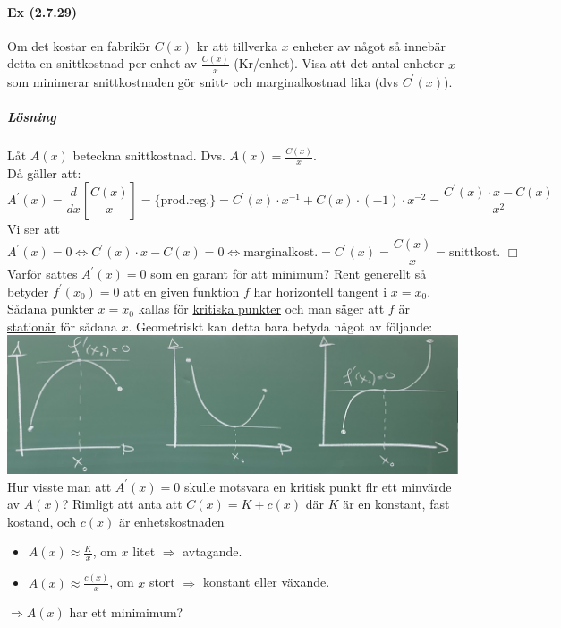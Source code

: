\paragraph{Ex (2.7.29)} Om det kostar en fabrikör $C(x)$ kr att tillverka $x$ enheter av något så innebär detta en snittkostnad per enhet av $\frac{C(x)}{x}$ (Kr/enhet).
Visa att det antal enheter $x$ som minimerar snittkostnaden gör snitt- och marginalkostnad lika (dvs $C^\prime(x)$).
\subparagraph{Lösning} Låt $A(x)$ beteckna snittkostnad. Dvs. $A(x)=\frac{C(x)}{x}$.\\
Då gäller att:
\begin{equation*}
    A^\prime(x)=\frac{d}{dx}[\frac{C(x)}{x}]=\{\text{prod.reg.}\}=C^\prime(x)\cdot x^{-1}+C(x)\cdot (-1)\cdot x^{-2}=\frac{C^\prime(x)\cdot x-C(x)}{x^2}
\end{equation*}
Vi ser att
\begin{equation*}
    A^\prime(x)=0\Leftrightarrow C^\prime(x)\cdot x-C(x)=0\Leftrightarrow\text{marginalkost.}=C^\prime(x)=\frac{C(x)}{x}=\text{snittkost. }\Box
\end{equation*}
Varför sattes $A^\prime(x)=0$ som en garant för att minimum?
Rent generellt så betyder $f^\prime(x_0)=0$ att en given funktion $f$ har horizontell tangent i $x=x_0$.
Sådana punkter $x=x_0$ kallas för \underline{kritiska punkter} och man säger att $f$ är \underline{stationär} för sådana $x$.
Geometriskt kan detta bara betyda något av följande:\\
\includegraphics[scale=0.1]{lessons/lesson07/imgs/img02.jpg}\\
Hur visste man att $A^\prime(x)=0$ skulle motsvara en kritisk punkt flr ett minvärde av $A(x)$?
Rimligt att anta att $C(x)=K+c(x)$ där $K$ är en konstant, fast kostand, och $c(x)$ är enhetskostnaden
\begin{itemize}
    \item $A(x)\approx \frac{K}{x}$, om $x$ litet $\Rightarrow$ avtagande.
    \item $A(x)\approx \frac{c(x)}{x}$, om $x$ stort $\Rightarrow$ konstant eller växande.
\end{itemize}
$\Rightarrow A(x)$ har ett minimimum?\\
